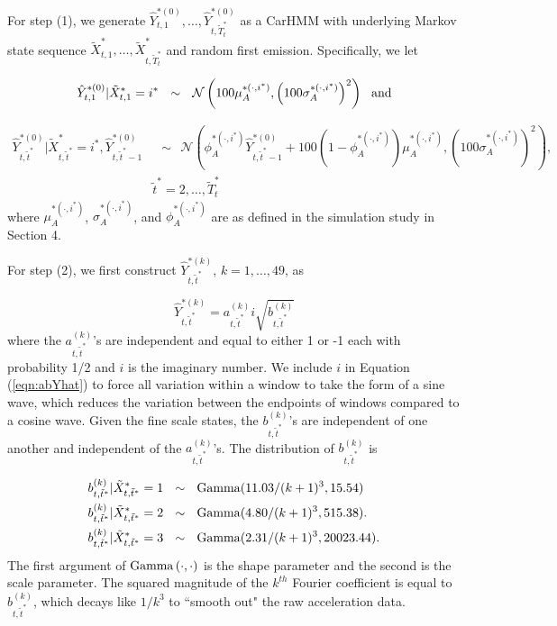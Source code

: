 For step (1), we generate $\hat Y^{*(0)}_{t,1}, \ldots, \hat Y^{*(0)}_{t,\tilde T_t^*}$ as a CarHMM with underlying Markov state sequence $\tilde X^{*}_{t,1}, \ldots, \tilde X^{*}_{t,\tilde T_t^*}$ and random first emission. Specifically, we let

   \[
    	\hat{Y}^{*(0)}_{t,1}|\tilde X^*_{t,1} = i^* ~~\sim~~ \mathcal{N} \left(100 \mu^{*(\cdot,i^*)}_A, \left(100\sigma_A^{*(\cdot,i^*)}\right)^2 \right)
    	~~{\rm{and}}
   \]
   
    \begin{align}	
       \hat{Y}^{*(0)}_{t,\tilde t^*}|\tilde X^*_{t,\tilde t^*} = i^*,\hat{Y}^{*(0)}_{t,\tilde t^*-1}
       &~~\sim ~~\mathcal{N} \left(\phi_A^{*(\cdot,i^*)} \hat{Y}^{*(0)}_{t,\tilde t^*-1} + 100(1-\phi_A^{*(\cdot,i^*)}) \mu^{*(\cdot,i^*)}_A, \left(100\sigma_A^{*(\cdot,i^*)}\right)^2 \right), \label{eqn:yhat_0} \\
        &\tilde t^* = 2,\ldots, \tilde T^*_t
    	\nonumber
    \end{align}
    where $\mu_A^{*(\cdot,i^*)}$, $\sigma_A^{*(\cdot,i^*)}$, and $\phi_A^{*(\cdot,i^*)}$ are as defined in the simulation study in Section 4.
  
 For step (2),
 we first construct $\hat{Y}^{*(k)}_{t,\tilde t^*}$, $k=1,\ldots, 49$, as
 
    \begin{equation}
        \hat{Y}^{*(k)}_{t,\tilde t^*} = a_{t,\tilde t^*}^{(k)} i\sqrt{b^{(k)}_{t,\tilde t^*}}
        \label{eqn:abYhat}
    \end{equation}
    where the $a^{(k)}_{t,\tilde t^*}$'s are independent and equal to either 1 or -1 each with probability 1/2 and $i$ is the imaginary number. We include $i$ in Equation (\ref{eqn:abYhat}) to force all variation within a window to take the form of a sine wave, which reduces the variation between the endpoints of windows compared to a cosine wave.
    Given the fine scale states, the $b^{(k)}_{t,\tilde t^*}$'s are independent of one another and independent of the $a^{(k)}_{t,\tilde t^*}$'s.  
   The distribution of $b^{(k)}_{t,\tilde t^*}$ is
   
    \begin{align}
    \begin{split}
    	b^{(k)}_{t,\tilde t^*}|\tilde X^*_{t,\tilde t^*} = 1 &~~\sim~~ {\rm{Gamma}}(11.03/(k+1)^3, 15.54) \\
    	b^{(k)}_{t,\tilde t^*}|\tilde X^*_{t,\tilde t^*} = 2  &~~\sim ~~{\rm{Gamma}}(4.80/(k+1)^3, 515.38). \\ 
    	b^{(k)}_{t,\tilde t^*}|\tilde X^*_{t,\tilde t^*} = 3  &~~\sim ~~{\rm{Gamma}}(2.31/(k+1)^3, 20023.44). 
    \end{split}
    \label{eqn:bdist}
    \end{align}
    The first argument of ${\rm{Gamma}}\left(\cdot,\cdot\right)$ is the shape parameter and the second is the scale parameter. The squared magnitude of the $k^{th}$ Fourier coefficient is equal to $b^{(k)}_{t,\tilde t^*}$, which decays like $1/k^3$ to ``smooth out" the raw acceleration data.
    
